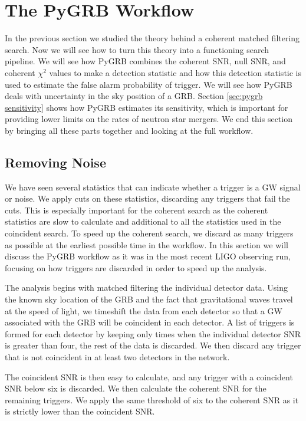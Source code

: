 \documentclass[11pt]{cuthesis}
\begin{document}
\section{The PyGRB Workflow} \label{sec:pygrb workflow}
In the previous section we studied the theory behind a coherent matched filtering search. Now we will see how to turn this theory into a functioning search pipeline. We will see how PyGRB combines the coherent SNR, null SNR, and coherent $\chi^2$ values to make a detection statistic and how this detection statistic is used to estimate the false alarm probability of trigger. We will see how PyGRB deals with uncertainty in the sky position of a GRB. Section \ref{sec:pygrb sensitivity} shows how PyGRB estimates its sensitivity, which is important for providing lower limits on the rates of neutron star mergers. We end this section by bringing all these parts together and looking at the full workflow.

\subsection{Removing Noise} \label{sec:thresholds}
We have seen several statistics that can indicate whether a trigger is a GW signal or noise. We apply cuts on these statistics, discarding any triggers that fail the cuts. This is especially important for the coherent search as the coherent statistics are slow to calculate and additional to all the statistics used in the coincident search. To speed up the coherent search, we discard as many triggers as possible at the earliest possible time in the workflow. In this section we will discuss the PyGRB workflow as it was in the most recent LIGO observing run, focusing on how triggers are discarded in order to speed up the analysis.

The analysis begins with matched filtering the individual detector data. Using the known sky location of the GRB and the fact that gravitational waves travel at the speed of light, we timeshift the data from each detector so that a GW associated with the GRB will be coincident in each detector. A list of triggers is formed for each detector by keeping only times when the individual detector SNR is greater than four, the rest of the data is discarded. We then discard any trigger that is not coincident in at least two detectors in the network. 

The coincident SNR is then easy to calculate, and any trigger with a coincident SNR below six is discarded. We then calculate the coherent SNR for the remaining triggers. We apply the same threshold of six to the coherent SNR as it is strictly lower than the coincident SNR. 
\end{document}
